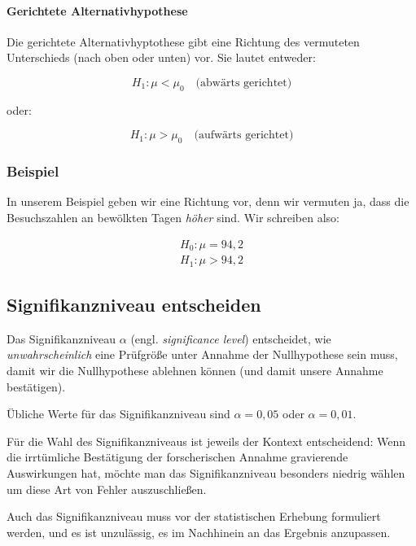 \documentclass[
  11pt,
  ngerman,
  a4paper,
]{report}
\begin{document}
\hypertarget{gerichtete-alternativhypothese}{%
\paragraph{Gerichtete Alternativhypothese}\label{gerichtete-alternativhypothese}}

Die gerichtete Alternativhyptothese gibt eine Richtung des vermuteten Unterschieds (nach oben oder unten) vor. Sie lautet entweder:

\[
H_1 : \mu < \mu_0 \quad \textrm{(abwärts gerichtet)}
\label{eq:h1l}
\]

oder:

\[
H_1 : \mu > \mu_0 \quad \textrm{(aufwärts gerichtet)}
\label{eq:h1g}
\]

\hypertarget{beispiel-1}{%
\subsubsection{Beispiel}\label{beispiel-1}}

In unserem Beispiel geben wir eine Richtung vor, denn wir vermuten ja, dass die Besuchszahlen an bewölkten Tagen \emph{höher} sind. Wir schreiben also:

\[\begin{aligned}
H_0: \mu = 94{,}2\\[4pt]
H_1: \mu>94{,}2
\end{aligned}\]

\hypertarget{signifikanzniveau-entscheiden}{%
\subsection{Signifikanzniveau entscheiden}\label{signifikanzniveau-entscheiden}}

Das Signifikanzniveau \(\alpha\) (engl. \emph{significance level}) entscheidet, wie \emph{unwahrscheinlich} eine Prüfgröße unter Annahme der Nullhypothese sein muss, damit wir die Nullhypothese ablehnen können (und damit unsere Annahme bestätigen).

Übliche Werte für das Signifikanzniveau sind \(\alpha=0{,}05\) oder \(\alpha=0{,}01\).

Für die Wahl des Signifikanzniveaus ist jeweils der Kontext entscheidend: Wenn die irrtümliche Bestätigung der forscherischen Annahme gravierende Auswirkungen hat, möchte man das Signifikanzniveau besonders niedrig wählen um diese Art von Fehler auszuschließen.

Auch das Signifikanzniveau muss vor der statistischen Erhebung formuliert werden, und es ist unzulässig, es im Nachhinein an das Ergebnis anzupassen.
\end{document}
